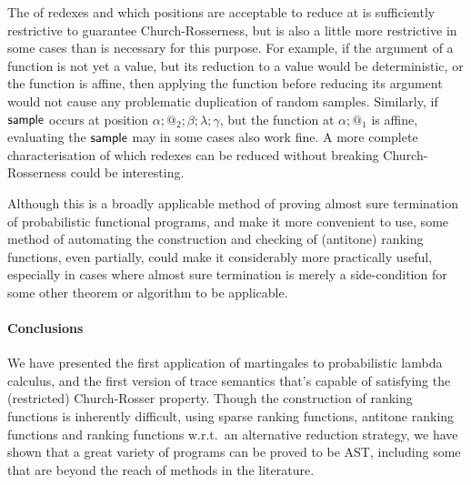 The  of redexes and which positions are acceptable to reduce at is sufficiently restrictive to guarantee Church-Rosserness, but is also a little more restrictive in some cases than is necessary for this purpose. For example, if the argument of a function is not yet a value, but its reduction to a value would be deterministic, or the function is affine, then applying the function before reducing its argument would not cause any problematic duplication of random samples. Similarly, if $\mathsf{sample}$ occurs at position $\alpha;@_2;\beta;\lambda;\gamma$, but the function at $\alpha;@_1$ is affine, evaluating the $\mathsf{sample}$ may in some cases also work fine. A more complete characterisation of which redexes can be reduced without breaking Church-Rosserness could be interesting.

Although this is a broadly applicable method of proving almost sure termination of probabilistic functional programs, and  make it more convenient to use, some method of automating the construction and checking of (antitone) ranking functions, even partially, could make it considerably more practically useful, especially in cases where almost sure termination is merely a side-condition for some other theorem or algorithm to be applicable.

\paragraph*{Conclusions}

We have presented the first application of martingales to probabilistic lambda calculus, and the first version of trace semantics that's capable of satisfying the (restricted) Church-Rosser property.
Though the construction of ranking functions is inherently difficult, using sparse ranking functions, antitone ranking functions and ranking functions w.r.t.~an alternative reduction strategy, we have shown that a great variety of programs can be proved to be AST, including some that are beyond the reach of methods in the literature.

